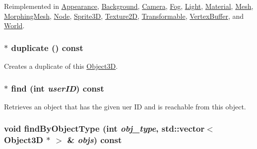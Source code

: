 Reimplemented in \hyperlink{classm3g_1_1Appearance_8aad1ceab4c2a03609c8a42324ce484d}{Appearance}, \hyperlink{classm3g_1_1Background_8aad1ceab4c2a03609c8a42324ce484d}{Background}, \hyperlink{classm3g_1_1Camera_8aad1ceab4c2a03609c8a42324ce484d}{Camera}, \hyperlink{classm3g_1_1Fog_8aad1ceab4c2a03609c8a42324ce484d}{Fog}, \hyperlink{classm3g_1_1Light_8aad1ceab4c2a03609c8a42324ce484d}{Light}, \hyperlink{classm3g_1_1Material_8aad1ceab4c2a03609c8a42324ce484d}{Material}, \hyperlink{classm3g_1_1Mesh_82cfeb67ca66b93e2ca7bda9a4f0e2aa}{Mesh}, \hyperlink{classm3g_1_1MorphingMesh_8aad1ceab4c2a03609c8a42324ce484d}{MorphingMesh}, \hyperlink{classm3g_1_1Node_8aad1ceab4c2a03609c8a42324ce484d}{Node}, \hyperlink{classm3g_1_1Sprite3D_8aad1ceab4c2a03609c8a42324ce484d}{Sprite3D}, \hyperlink{classm3g_1_1Texture2D_82cfeb67ca66b93e2ca7bda9a4f0e2aa}{Texture2D}, \hyperlink{classm3g_1_1Transformable_8aad1ceab4c2a03609c8a42324ce484d}{Transformable}, \hyperlink{classm3g_1_1VertexBuffer_82cfeb67ca66b93e2ca7bda9a4f0e2aa}{VertexBuffer}, and \hyperlink{classm3g_1_1World_8aad1ceab4c2a03609c8a42324ce484d}{World}.\hypertarget{classm3g_1_1Object3D_a25110dac934f867b83b73ad4741a0f4}{
\subsubsection[{duplicate}]{ $\ast$ duplicate () const}}
\label{classm3g_1_1Object3D_a25110dac934f867b83b73ad4741a0f4}


Creates a duplicate of this \hyperlink{classm3g_1_1Object3D}{Object3D}. \hypertarget{classm3g_1_1Object3D_aa62f6aaac2e9359875f027ca05788ac}{
\subsubsection[{find}]{ $\ast$ find (int {\em userID}) const}}
\label{classm3g_1_1Object3D_aa62f6aaac2e9359875f027ca05788ac}


Retrieves an object that has the given uer ID and is reachable from this object. \hypertarget{classm3g_1_1Object3D_4dadb21b568b0230fac106f15040138c}{
\subsubsection[{findByObjectType}]{\setlength{\rightskip}{0pt plus 5cm}void findByObjectType (int {\em obj\_\-type}, \/  std::vector$<$ {\bf Object3D} $\ast$ $>$ \& {\em objs}) const}}
\label{classm3g_1_1Object3D_4dadb21b568b0230fac106f15040138c}


